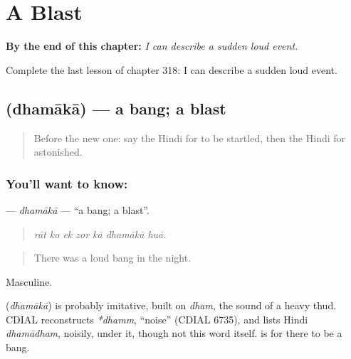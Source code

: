 
\chapter{A Blast}
\label{ch:hi-a-blast}

\begin{chapteropening}
\textbf{By the end of this chapter:} \emph{I can describe a sudden loud event.}

Complete the last lesson of chapter 318: I can describe a sudden loud event.
\end{chapteropening}

\section[\texorpdfstring{\hi{धमाका} (dhamākā)}{धमाका (dhamākā)}]{ (dhamākā) — a bang; a blast}

\label{lesson:HI-C318-dhamaka}



\begin{quote}
Before the new one: say the Hindi for to be startled, then the Hindi for astonished.
\end{quote}

\subsection*{You'll want to know: }
\textbf{} — \emph{dhamākā} — \textquotedblleft{}a bang; a blast\textquotedblright{}.

\begin{quote}
      
\end{quote}

\begin{quote}
\emph{rāt ko ek zor kā dhamākā huā.}
\end{quote}

\begin{quote}
There was a loud bang in the night.
\end{quote}

Masculine.

\begin{cousinweb}
\textbf{} (\emph{dhamākā}) is probably imitative, built on \emph{dham}, the sound of a heavy thud. CDIAL reconstructs \emph{*dhamm}, \textquotedblleft{}noise\textquotedblright{} (CDIAL 6735), and lists Hindi \emph{dhamādham}, noisily, under it, though not this word itself. \textbf{ } is for there to be a bang.
\end{cousinweb}

